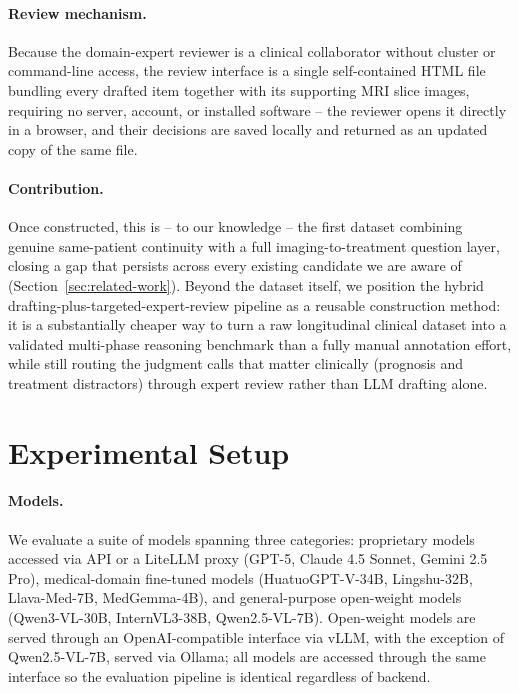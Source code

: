 \documentclass[11pt]{article}
\begin{document}
\paragraph{Review mechanism.} Because the domain-expert reviewer is a clinical collaborator without cluster or command-line access, the review interface is a single self-contained HTML file bundling every drafted item together with its supporting MRI slice images, requiring no server, account, or installed software -- the reviewer opens it directly in a browser, and their decisions are saved locally and returned as an updated copy of the same file.

\paragraph{Contribution.} Once constructed, this is -- to our knowledge -- the first dataset combining genuine same-patient continuity with a full imaging-to-treatment question layer, closing a gap that persists across every existing candidate we are aware of (Section~\ref{sec:related-work}). Beyond the dataset itself, we position the hybrid drafting-plus-targeted-expert-review pipeline as a reusable construction method: it is a substantially cheaper way to turn a raw longitudinal clinical dataset into a validated multi-phase reasoning benchmark than a fully manual annotation effort, while still routing the judgment calls that matter clinically (prognosis and treatment distractors) through expert review rather than LLM drafting alone.

\section{Experimental Setup}
\label{sec:setup}

\paragraph{Models.} We evaluate a suite of models spanning three categories: proprietary models accessed via API or a LiteLLM proxy (GPT-5, Claude 4.5 Sonnet, Gemini 2.5 Pro), medical-domain fine-tuned models (HuatuoGPT-V-34B, Lingshu-32B, Llava-Med-7B, MedGemma-4B), and general-purpose open-weight models (Qwen3-VL-30B, InternVL3-38B, Qwen2.5-VL-7B). Open-weight models are served through an OpenAI-compatible interface via vLLM, with the exception of Qwen2.5-VL-7B, served via Ollama; all models are accessed through the same interface so the evaluation pipeline is identical regardless of backend.
\end{document}
